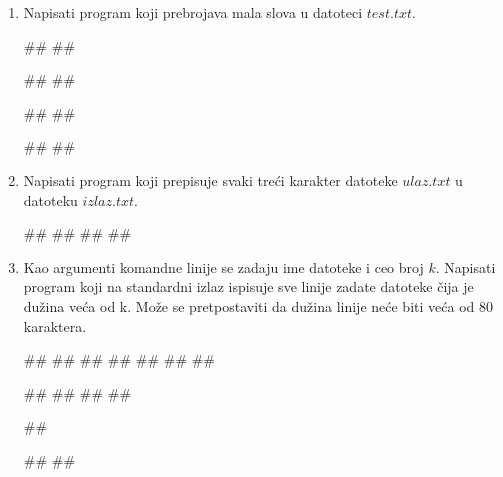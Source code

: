 \begin{enumerate}
\item Napisati program koji prebrojava mala slova u datoteci $test.txt$. \\
\begin{miditest}
\begin{upotreba}{1}
##
##

#\naslovIzlaz#
##
\end{upotreba}
\end{miditest}
\begin{miditest}
\begin{upotreba}{2}
##
##

#\naslovIzlaz#
##
\end{upotreba}
\end{miditest}

\item Napisati program koji prepisuje svaki treći karakter datoteke $ulaz.txt$ u datoteku $izlaz.txt$.\\
\begin{miditest}
\begin{upotreba}{1}
##
##
##
##
\end{upotreba}
\end{miditest}

\item Kao argumenti komandne linije se zadaju ime datoteke i ceo broj $k$. Napisati program koji na  standardni izlaz ispisuje sve linije zadate datoteke čija je dužina veća od k. Može se pretpostaviti da dužina linije neće biti veća od 80 karaktera.\\
\begin{miditest}
\begin{upotreba}{1}
##
##
##
##
##
##
##

#\naslovIzlaz#
##
##
##
\end{upotreba}
\end{miditest}
\begin{miditest}
\begin{upotreba}{2}
##

#\naslovIzlaz#
##
\end{upotreba}
\end{miditest}


\end{enumerate}
